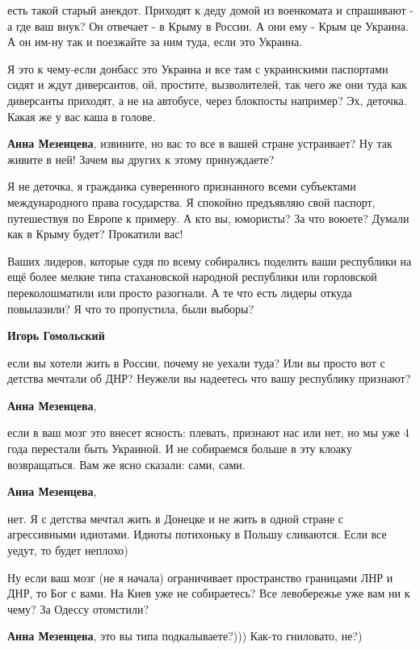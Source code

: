 \begin{itemize}
\begin{itemize}
есть такой старый анекдот. Приходят к деду домой из военкомата и спрашивают - а
где ваш внук? Он отвечает - в Крыму в России. А они ему - Крым це Украина. А он
им-ну так и поезжайте за ним туда, если это Украина.

Я это к чему-если донбасс это Украина и все там с украинскими паспортами сидят
и ждут диверсантов, ой, простите, вызволителей, так чего же они туда как диверсанты
приходят, а не на автобусе, через блокпосты например? Эх, деточка. Какая же у вас
каша в голове.

\textbf{Анна Мезенцева}, извините, но вас то все в вашей стране устраивает? Ну так живите в ней! Зачем вы других к этому принуждаете?


Я не деточка, я гражданка суверенного признанного всеми субъектами
международного права государства. Я спокойно предъявляю свой паспорт,
путешествуя по Европе к примеру. А кто вы, юмористы? За что воюете? Думали как
в Крыму будет? Прокатили вас!

Ваших лидеров, которые судя по всему собирались поделить ваши республики на ещё
более мелкие типа стахановской народной республики или горловской
переколошматили или просто разогнали. А те что есть лидеры откуда повылазили? Я
что то пропустила, были выборы?

\textbf{Игорь Гомольский} 

если вы хотели жить в России, почему не уехали туда? Или вы просто вот с
детства мечтали об ДНР? Неужели вы надеетесь что вашу республику признают?

\textbf{Анна Мезенцева},

если в ваш мозг это внесет ясность: плевать, признают нас или нет, но мы уже 4
года перестали быть Украиной. И не собираемся больше в эту клоаку возвращаться.
Вам же ясно сказали: сами, сами.

\textbf{Анна Мезенцева}, 

нет. Я с детства мечтал жить в Донецке и не жить в одной стране с агрессивными
идиотами. Идиоты потихоньку в Польшу сливаются. Если все уедут, то будет
неплохо)


Ну если ваш мозг (не я начала) ограничивает пространство границами ЛНР и ДНР,
то Бог с вами. На Киев уже не собираетесь? Все левобережье уже вам ни к чему?
За Одессу отомстили?

\textbf{Анна Мезенцева}, это вы типа подкалываете?))) Как-то гниловато, не?)


\end{itemize}
\end{itemize}
